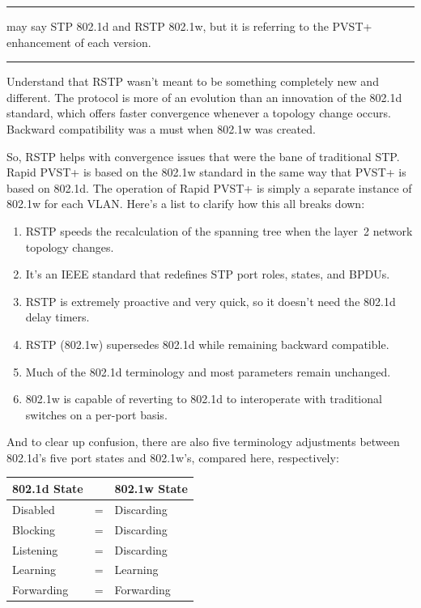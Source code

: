 \documentclass[b5paper,11pt]{memoir}
\begin{document}
\begin{center}\rule{0.5\linewidth}{0.5pt}\end{center}

may say STP 802.1d and RSTP 802.1w, but it is referring to the PVST+
enhancement of each version.

\begin{center}\rule{0.5\linewidth}{0.5pt}\end{center}

Understand that RSTP wasn't meant to be something completely new and
different. The protocol is more of an evolution than an innovation of
the 802.1d standard, which offers faster convergence whenever a topology
change occurs. Backward compatibility was a must when 802.1w was
created.

So, RSTP helps with convergence issues that were the bane of traditional
STP. Rapid PVST+ is based on the 802.1w standard in the same way that
PVST+ is based on 802.1d. The operation of Rapid PVST+ is simply a
separate instance of 802.1w for each VLAN. Here's a list to clarify how
this all breaks down:

\begin{enumerate}
\tightlist
\item
  RSTP speeds the recalculation of the spanning tree when the layer~2
  network topology changes.
\item
  It's an IEEE standard that redefines STP port roles, states, and
  BPDUs.
\item
  RSTP is extremely proactive and very quick, so it doesn't need the
  802.1d delay timers.
\item
  RSTP (802.1w) supersedes 802.1d while remaining backward compatible.
\item
  Much of the 802.1d terminology and most parameters remain unchanged.
\item
  802.1w is capable of reverting to 802.1d to interoperate with
  traditional switches on a per-port basis.
\end{enumerate}

And to clear up
confusion, there are also five terminology adjustments between 802.1d's
five port states and 802.1w's, compared here, respectively:

\begin{longtable}[]{@{}lll@{}}
\toprule
802.1d State & & 802.1w State\tabularnewline
\midrule
\endhead
Disabled & = & Discarding\tabularnewline
Blocking & = & Discarding\tabularnewline
Listening & = & Discarding\tabularnewline
Learning & = & Learning\tabularnewline
Forwarding & = & Forwarding\tabularnewline
\bottomrule
\end{longtable}
\end{document}
